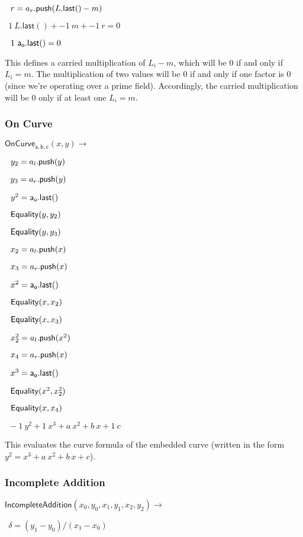 \documentclass[]{article}
\begin{document}
$~~r = a_r\mathsf{.push}(L\mathsf{.last}() - m)$

$~~1 ~L\mathsf{.last}() + -1 ~m + -1 ~r = 0$

$~~1 ~\mathsf{a_o.last()} = 0$

This defines a carried multiplication of $L_i - m$, which will be $0$ if and only if $L_i = m$. The multiplication of two values will be $0$ if and only if one factor is $0$ (since we're operating over a prime field). Accordingly, the carried multiplication will be $0$ only if at least one $L_i = m$.

\subsubsection{On Curve}

\newcommand{\oncurve}{\mathsf{OnCurve_{a,b,c}}}

$\oncurve(x, y) \rightarrow$

$~~y_2 = a_l\mathsf{.push}(y)$

$~~y_3 = a_r\mathsf{.push}(y)$

$~~y^2 = \mathsf{a_o.last()}$

$~~\mathsf{Equality}(y, y_2)$

$~~\mathsf{Equality}(y, y_3)$

$~~x_2 = a_l\mathsf{.push}(x)$

$~~x_3 = a_r\mathsf{.push}(x)$

$~~x^2 = \mathsf{a_o.last()}$

$~~\mathsf{Equality}(x, x_2)$

$~~\mathsf{Equality}(x, x_3)$

$~~x^2_2 = a_l\mathsf{.push}(x^2)$

$~~x_4 = a_r\mathsf{.push}(x)$

$~~x^3 = \mathsf{a_o.last()}$

$~~\mathsf{Equality}(x^2, x^2_2)$

$~~\mathsf{Equality}(x, x_4)$

$~~-1 ~y^2 + 1 ~x^3 + a ~x^2 + b ~x + 1 ~c$

This evaluates the curve formula of the embedded curve (written in the form $y^2 = x^3 + a ~x^2 + b ~x + c$).

\newpage

\subsubsection{Incomplete Addition}

\newcommand{\incompleteadd}{\mathsf{IncompleteAddition}}

$\incompleteadd(x_0, y_0, x_1, y_1, x_2, y_2) \rightarrow$

$~~\delta = (y_1 - y_0) / (x_1 - x_0)$
\end{document}
